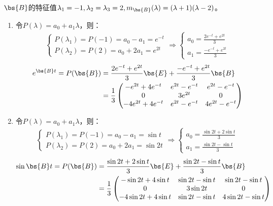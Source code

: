 \documentclass[12pt, a4paper, oneside, UTF8]{ctexbook}
\begin{document}
\begin{solution}
    $\bs{B}$的特征值$\lambda_1=-1,\lambda_2=\lambda_3=2,m_{\bs{B}}(\lambda)=(\lambda+1)(\lambda-2)$。
    \begin{enumerate}[label=(\arabic*)]
        \item 令$P(\lambda)=a_0+a_1\lambda$，则：
        \begin{align*}
        \left\{
            \begin{array}{ll}
                P(\lambda_1)=P(-1)=a_0-a_1=e^{-t}\\
                P(\lambda_2)=P(2)=a_0+2a_1=e^{2t}
            \end{array}
            \right.
        \Rightarrow
        \left\{
            \begin{array}{ll}
                a_0=\frac{2e^{-t}+e^{2t}}{3}\\
                a_1=\frac{-e^{-t}+e^{2t}}{3}
            \end{array}
            \right.
        \end{align*}
        \begin{align*}
            e^{\bs{B}t}=P(\bs{B})
        &=\frac{2e^{-t}+e^{2t}}{3}\bs{E}+\frac{-e^{-t}+e^{2t}}{3}\bs{B}\\
        &=\frac{1}{3}\begin{pmatrix}
            -e^{2t}+4e^{-t} &e^{2t}-e^{-t} &e^{2t}-e^{-t} \\
            0 & 3e^{2t}& 0\\
            -4e^{2t}+4e^{-t}&e^{2t}-e^{-t}&4e^{2t}-e^{-t}
        \end{pmatrix}
        \end{align*}
        \item 令$P(\lambda)=a_0+a_1\lambda$，则：
        \begin{align*}
        \left\{
            \begin{array}{ll}
                P(\lambda_1)=P(-1)=a_0-a_1=\sin t\\
                P(\lambda_2)=P(2)=a_0+2a_1=\sin 2t
            \end{array}
            \right.
            \Rightarrow
            \left\{
                \begin{array}{ll}
                    a_0=\frac{\sin 2t+2\sin t}{3}\\
                    a_1=\frac{\sin 2t-\sin t}{3}
                \end{array}
                \right.
        \end{align*}
        \begin{align*}
            \sin \bs{B}t=P(\bs{B})
        &=\frac{\sin 2t+2\sin t}{3}\bs{E}+\frac{\sin 2t-\sin t}{3}\bs{B}\\
        &=\frac{1}{3}\begin{pmatrix}
            -\sin 2t +4\sin t &\sin 2t-\sin t &\sin 2t-\sin t\\
            0 & 3\sin 2t& 0\\
            -4\sin 2t+4\sin t&\sin 2t-\sin t&4\sin 2t -\sin t
        \end{pmatrix}
    \end{align*}
    \end{enumerate}
\end{solution}
\end{document}
